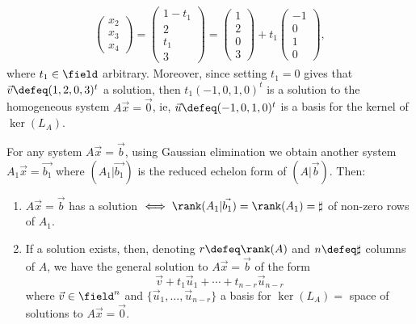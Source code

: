 \begin{example}
\begin{align*}
\begin{pmatrix}
            x_2\\
            x_3\\
            x_4
        \end{pmatrix} = \begin{pmatrix}
            1 - t_1\\
            2\\
            t_1\\
            3
        \end{pmatrix} = \begin{pmatrix}
            1\\
            2\\
            0\\
            3
        \end{pmatrix} + t_1\begin{pmatrix}
            -1\\
            0\\
            1\\
            0
        \end{pmatrix},
    \end{align*}
    where $t_1 \in \field$ arbitrary. Moreover, since setting $t_1 = 0$ gives that $\vec{v} \defeq (1, 2, 0, 3)^t$ a solution, then $t_1 (-1, 0, 1, 0)^t$ is a solution to the homogeneous system $A \vec{x} = \vec{0}$, ie, $\vec{u} \defeq (-1, 0, 1, 0)^t$ is a basis for the kernel of $\ker(L_A)$.
\end{example}

\begin{theorem}
    For any system $A \vec{x} = \vec{b}$, using Gaussian elimination we obtain another system $A_1 \vec{x}=\vec{b_1}$ where $(A_1 \vert \vec{b_1})$ is the reduced echelon form of $(A \vert \vec{b})$. Then:
    \begin{enumerate}
        \item $A \vec{x} = \vec{b}$ has a solution $\iff \rank(A_1 \vert \vec{b_1}) = \rank(A_1) = \sharp $ of non-zero rows of $A_1$.
        \item If a solution exists, then, denoting $r \defeq \rank(A)$ and $n \defeq \sharp$ columns of $A$, we have the general solution to $A \vec{x} = \vec{b}$ of the form $$\vec{v} + t_1 \vec{u}_1 + \cdots + t_{n-r} \vec{u}_{n-r}$$ where $\vec{v} \in \field^n$ and $\{\vec{u}_1, \dots, \vec{u}_{n-r}\}$ a basis for $\ker(L_A) = $ space of solutions to $A \vec{x} = \vec{0}$.
    \end{enumerate}
\end{theorem}


